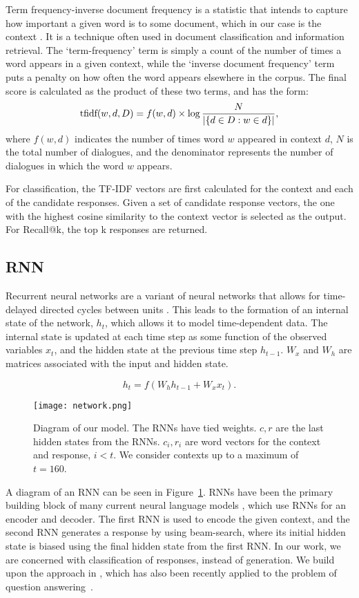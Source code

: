 \documentclass[11pt,a4paper]{article}
\begin{document}
Term frequency-inverse document frequency is a statistic that intends to capture how important a given word is to some document, which in our case is the context \cite{ramos2003using}. It is a technique often used in document classification and information retrieval. The `term-frequency' term is simply a count of the number of times a word appears in a given  context, while the `inverse document frequency' term puts a penalty on how often the word appears elsewhere in the corpus. The final score is calculated as the product of these two terms, and has the form:
$$
\textmd{tfidf}(w,d,D) = f(w,d) \times \log \frac{N}{|\{d \in D : w \in d\}|},
$$
where $f(w,d)$ indicates the number of times word $w$ appeared in context $d$, $N$ is the total number of dialogues, and the denominator represents the number of dialogues in which the word $w$  appears. 

For classification, the TF-IDF vectors are first calculated for the context and each of the candidate responses. Given a set of candidate response vectors, the one with the highest cosine similarity to the context vector is selected as the output. For Recall@k, the top k responses are returned.

\subsection{RNN}


Recurrent neural networks are a variant of neural networks that allows for time-delayed directed cycles between units \cite{medsker2001recurrent}. This leads to the formation of an internal state of the network, $h_t$,  which allows it to model time-dependent data. The internal state is updated at each time step as some function of the observed variables $x_t$, and the hidden state at the previous time step $h_{t-1}$. $W_{x}$ and $W_{h}$ are matrices associated with the input and hidden state.

$$ h_{t} = f(W_{h}h_{t-1} + W_{x}x_t).$$

\begin{figure}
\centering
\texttt{[image: network.png]}
\caption{\label{rnn1}Diagram of our model. The RNNs have tied weights. $c, r$ are the last hidden states from the RNNs. $c_{i}, r_{i}$ are word vectors for the context and response, $i < t$. We consider contexts up to a maximum of $t = 160$. }
\end{figure}

A diagram of an RNN can be seen in Figure~\ref{rnn1}. RNNs have been the primary building block of many current neural language models \cite{ritter2011data, sordoni2015}, which use RNNs for an encoder and decoder. The first RNN is used to encode the given context, and the second RNN generates a response by using beam-search, where its initial hidden state is biased using the final hidden state from the first RNN.  In our work, we are concerned with classification of responses, instead of generation. We build upon the approach in \cite{bordes2014open}, which has also been recently applied to the problem of question answering~\cite{yu2014deep}.
\end{document}
